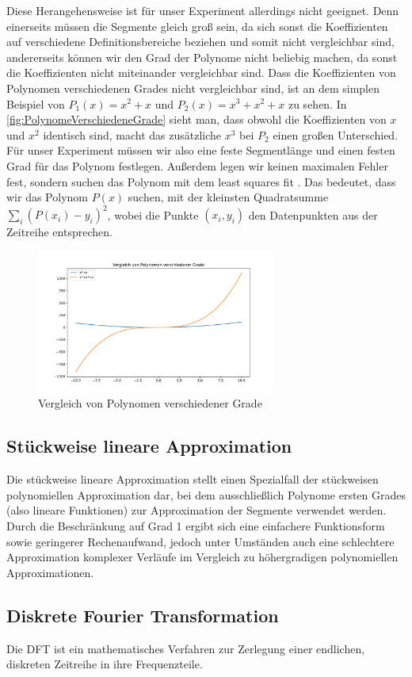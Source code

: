 Diese Herangehensweise ist für unser Experiment allerdings nicht geeignet. Denn einerseits müssen die Segmente gleich groß sein, da sich sonst die Koeffizienten auf verschiedene Definitionsbereiche beziehen und somit nicht vergleichbar sind, andererseits können wir den Grad der Polynome nicht beliebig machen, da sonst die Koeffizienten nicht miteinander vergleichbar sind. Dass die Koeffizienten von Polynomen verschiedenen Grades nicht vergleichbar sind, ist an dem simplen Beispiel von $P_1(x)=x^2+x$ und $P_2(x)=x^3+x^2+x$ zu sehen. In \autoref{fig:PolynomeVerschiedeneGrade} sieht man, dass obwohl die Koeffizienten von $x$ und $x^2$ identisch sind, macht das zusätzliche $x^3$ bei $P_2$ einen großen Unterschied. Für unser Experiment müssen wir also eine feste Segmentlänge und einen festen Grad für das Polynom festlegen. Außerdem legen wir keinen maximalen Fehler fest, sondern suchen das Polynom mit dem least squares fit \cite[Def. least squares fitting]{end}. Das bedeutet, dass wir das Polynom $P(x)$ suchen, mit der kleinsten Quadratsumme $\sum_i (P(x_i)-y_i)^2$, wobei die Punkte $(x_i,y_i)$ den Datenpunkten aus der Zeitreihe entsprechen.
\begin{figure}[bth] 
  \centering
  \includegraphics[width=0.7\textwidth]{Graphics/ComparissonDifferentPolDegrees.pdf}
  \caption{Vergleich von Polynomen verschiedener Grade}
  \label{fig:PolynomeVerschiedeneGrade}
\end{figure}

\subsection{Stückweise lineare Approximation}
Die stückweise lineare Approximation stellt einen Spezialfall der stückweisen polynomiellen Approximation dar, bei dem ausschließlich Polynome ersten Grades (also lineare Funktionen) zur Approximation der Segmente verwendet werden.
Durch die Beschränkung auf Grad 1 ergibt sich eine einfachere Funktionsform sowie geringerer Rechenaufwand, jedoch unter Umständen auch eine schlechtere Approximation komplexer Verläufe im Vergleich zu höhergradigen polynomiellen Approximationen.

\subsection{Diskrete Fourier Transformation}
Die \ac{DFT} ist ein mathematisches Verfahren zur Zerlegung einer endlichen, diskreten Zeitreihe in ihre Frequenzteile.